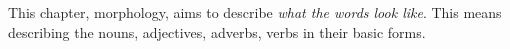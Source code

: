 This chapter, morphology, aims to describe \emph{what the words look like}.
This means describing the nouns, adjectives, adverbs, verbs in their basic forms.





